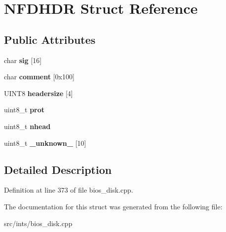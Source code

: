 \hypertarget{structNFDHDR}{\section{N\-F\-D\-H\-D\-R Struct Reference}
\label{structNFDHDR}
}
\subsection*{Public Attributes}
\begin{DoxyCompactItemize}
\item 
\hypertarget{structNFDHDR_a287510a3fba986d88360a51b86662a47}{char {\bfseries sig} \mbox{[}16\mbox{]}}\label{structNFDHDR_a287510a3fba986d88360a51b86662a47}

\item 
\hypertarget{structNFDHDR_a350778cea68716b43c76ae565493e0b7}{char {\bfseries comment} \mbox{[}0x100\mbox{]}}\label{structNFDHDR_a350778cea68716b43c76ae565493e0b7}

\item 
\hypertarget{structNFDHDR_a723cd4bc047e73bed07a4d73194b6f66}{U\-I\-N\-T8 {\bfseries headersize} \mbox{[}4\mbox{]}}\label{structNFDHDR_a723cd4bc047e73bed07a4d73194b6f66}

\item 
\hypertarget{structNFDHDR_a21bbc9bc51e0c4d60f4a346d3200a711}{uint8\-\_\-t {\bfseries prot}}\label{structNFDHDR_a21bbc9bc51e0c4d60f4a346d3200a711}

\item 
\hypertarget{structNFDHDR_aaa6f51d022023940a082286c901d5d48}{uint8\-\_\-t {\bfseries nhead}}\label{structNFDHDR_aaa6f51d022023940a082286c901d5d48}

\item 
\hypertarget{structNFDHDR_a00502b1eed3b27288390871c82277f7d}{uint8\-\_\-t {\bfseries \-\_\-unknown\-\_\-} \mbox{[}10\mbox{]}}\label{structNFDHDR_a00502b1eed3b27288390871c82277f7d}

\end{DoxyCompactItemize}


\subsection{Detailed Description}


Definition at line 373 of file bios\-\_\-disk.\-cpp.



The documentation for this struct was generated from the following file\-:\begin{DoxyCompactItemize}
\item 
src/ints/bios\-\_\-disk.\-cpp\end{DoxyCompactItemize}
